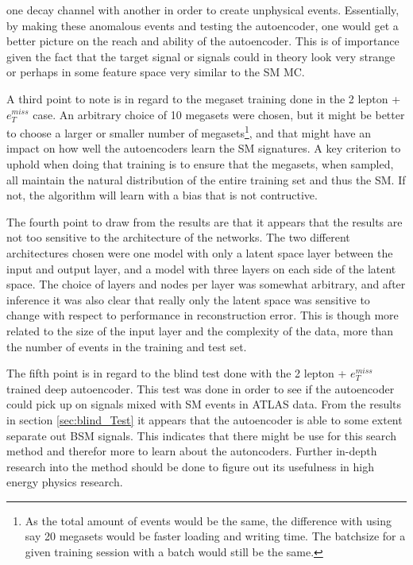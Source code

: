 one decay channel with another in order to create unphysical events. Essentially, 
by making these anomalous events and testing the autoencoder, one would get a better 
picture on the reach and ability of the autoencoder. This is of importance given the 
fact that the target signal or signals could in theory look very strange or perhaps 
in some feature space very similar to the SM MC. \par 
A third point to note is in regard to the megaset training done in the 2 lepton + 
$e_T^{miss}$ case. An arbitrary choice of 10 megasets were chosen, but it might 
be better to choose a larger or smaller number of megasets\footnote{As the total 
amount of events would be the same, the difference with using say 20 megasets would 
be faster loading and writing time. The batchsize for a given training session with a batch 
would still be the same. }, and that might have an impact
on how well the autoencoders learn the SM signatures. A key criterion to uphold when 
doing that training is to ensure that the megasets, when sampled, all maintain the natural distribution of 
the entire training set and thus the SM. If not, the algorithm will learn
with a bias that is not contructive. \par 
The fourth point to draw from the results are that it appears that the results are not 
too sensitive to the architecture of the networks. The two different architectures chosen
were one model with only a latent space layer between the input and output layer, and a model
with three layers on each side of the latent space. The choice of layers and nodes per layer 
was somewhat arbitrary, and after inference it was also clear that really only the latent space
was sensitive to change with respect to performance in reconstruction error. This is though 
more related to the size of the input layer and the complexity of the data, more than 
the number of events in the training and test set. \par 
The fifth point is in regard to the blind test done with the 2 lepton + $e_T^{miss}$ trained 
deep autoencoder. This test was done in order to see if the autoencoder could pick up on
signals mixed with SM events in ATLAS data. 
From the results in section \ref{sec:blind_Test} it appears that the autoencoder is able
to some extent separate out BSM signals. This indicates that there might be use for this 
search method and therefor more to learn about the autoncoders. Further in-depth research into 
the method should be done to figure out its usefulness in high energy physics research. 